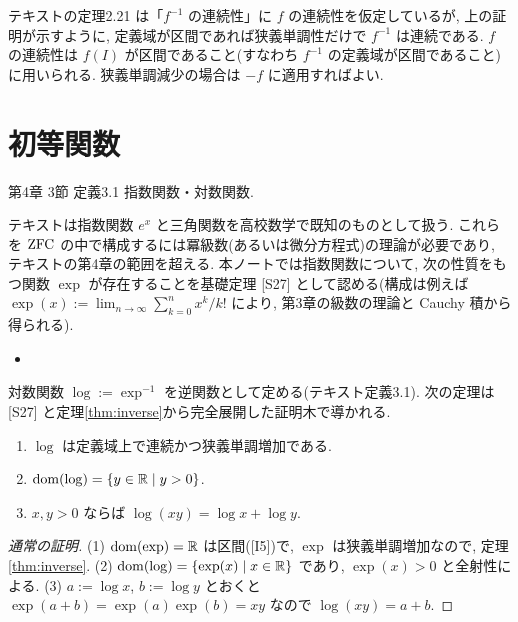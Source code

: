 テキストの定理2.21 は「$f^{-1}$ の連続性」に $f$ の連続性を仮定しているが, 上の証明が示すように, 定義域が区間であれば狭義単調性だけで $f^{-1}$ は連続である. $f$ の連続性は $f(I)$ が区間であること(すなわち $f^{-1}$ の定義域が区間であること)に用いられる. 狭義単調減少の場合は $-f$ に適用すればよい.

\section{初等関数}

\begin{textref}{第4章 3節 定義3.1}
  指数関数・対数関数.
\end{textref}

テキストは指数関数 $e^x$ と三角関数を高校数学で既知のものとして扱う. これらを $\mathrm{ZFC}$ の中で構成するには冪級数(あるいは微分方程式)の理論が必要であり, テキストの第4章の範囲を超える. 本ノートでは指数関数について, 次の性質をもつ関数 $\exp$ が存在することを基礎定理 [S27] として認める(構成は例えば $\exp(x) := \lim_{n \to \infty} \sum_{k=0}^n x^k/k!$ により, 第3章の級数の理論と Cauchy 積から得られる).
\begin{itemize}
  \item[{[S27]}] 
\end{itemize}
対数関数 $\log := \exp^{-1}$ を逆関数として定める(テキスト定義3.1). 次の定理は [S27] と定理\ref{thm:inverse}から完全展開した証明木で導かれる.

\begin{lem}\end{lem}

\begin{thm}
  \begin{enumerate}[label=(\arabic*)]
    \item $\log$ は定義域上で連続かつ狭義単調増加である.
    \item $\mathrm{dom}(\log) = \{y \in \mathbb{R} \mid y > 0\}$.
    \item $x, y > 0$ ならば $\log(xy) = \log x + \log y$.
  \end{enumerate}
\end{thm}
\begin{proof}[通常の証明]
  (1) $\mathrm{dom}(\exp) = \mathbb{R}$ は区間([I5])で, $\exp$ は狭義単調増加なので, 定理\ref{thm:inverse}. (2) $\mathrm{dom}(\log) = \{\exp(x) \mid x \in \mathbb{R}\}$ であり, $\exp(x) > 0$ と全射性による. (3) $a := \log x$, $b := \log y$ とおくと $\exp(a + b) = \exp(a)\exp(b) = xy$ なので $\log(xy) = a + b$.
\end{proof}

